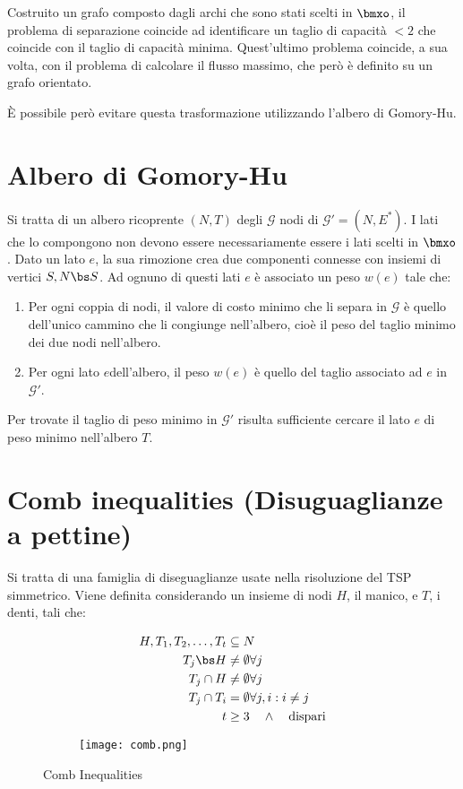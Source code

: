 \documentclass[\main/main.tex]{subfiles}
\begin{document}
Costruito un grafo composto dagli archi che sono stati scelti in \(\bmxo \), il problema di separazione coincide ad identificare un taglio di capacità \(<2\) che coincide con il taglio di capacità minima. Quest'ultimo problema coincide, a sua volta, con il problema di calcolare il flusso massimo, che però è definito su un grafo orientato.

È possibile però evitare questa trasformazione utilizzando l'albero di Gomory-Hu.
\clearpage
\section{Albero di Gomory-Hu}
Si tratta di un albero ricoprente \((N,T)\) degli \(\mathcal{G}\) nodi di \(\mathcal{G}'=(N,E^*)\). I lati che lo compongono non devono essere necessariamente essere i lati scelti in \(\bmxo \). Dato un lato \(e\), la sua rimozione crea due componenti connesse con insiemi di vertici \(S, N\bs S\). Ad ognuno di questi lati \(e\) è associato un peso \(w(e)\) tale che:

\begin{enumerate}
\item Per ogni coppia di nodi, il valore di costo minimo che li separa in \(\mathcal{G}\) è quello dell'unico cammino che li congiunge nell'albero, cioè il peso del taglio minimo dei due nodi nell'albero.
\item Per ogni lato \(e\)dell'albero, il peso \(w(e)\) è quello del taglio associato ad \(e\) in \(\mathcal{G}'\).
\end{enumerate}

Per trovate il taglio di peso minimo in \(\mathcal{G}'\) risulta sufficiente cercare il lato \(e\) di peso minimo nell'albero \(T\).
\clearpage
\section{Comb inequalities (Disuguaglianze a pettine)}
Si tratta di una famiglia di diseguaglianze usate nella risoluzione del TSP simmetrico. Viene definita considerando un insieme di nodi \(H\), il manico, e \(T\), i denti, tali che:

\begin{figure}
    \begin{subfigure}{0.49\textwidth}
        \begin{align*}
            H, T_1, T_2, \ldots, T_t &\subseteq N\\
            T_j\bs H &\neq \emptyset \forall j\\
            T_j \cap H &\neq \emptyset \forall j\\
            T_j \cap T_i &= \emptyset \forall j,i: i\neq j\\
            t &\geq 3 \quad \land \quad \text{dispari}
        \end{align*}
    \end{subfigure}
    \begin{subfigure}{0.49\textwidth}
        \texttt{[image: comb.png]}
    \end{subfigure}
    \caption{Comb Inequalities}
\end{figure}
\end{document}
